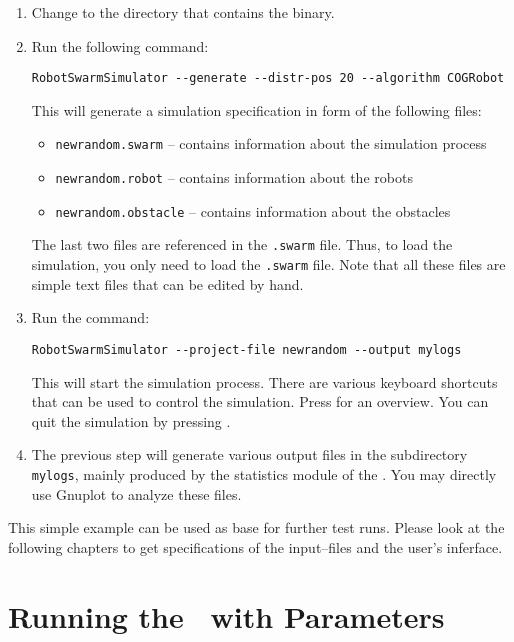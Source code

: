 \documentclass[a4paper,halfparskip,11pt,twoside]{scrartcl}
\begin{document}
\begin{enumerate}
	\item Change to the directory that contains the \RSS binary.
	\item Run the following command:

		\centerline{\tt RobotSwarmSimulator -{}-generate -{}-distr-pos 20 -{}-algorithm COGRobot}

		This will generate a simulation specification in form of the following files:
		\begin{itemize}
			\item {\tt newrandom.swarm} -- contains information about the simulation process
			\item {\tt newrandom.robot} -- contains information about the robots
			\item {\tt newrandom.obstacle} -- contains information about the obstacles
		\end{itemize}
		The last two files are referenced in the {\tt .swarm} file. Thus, to load the simulation, you only need to load the {\tt .swarm} file. Note that all these files
are simple text files that can be edited by hand.
	\item Run the command:

		\centerline{\tt RobotSwarmSimulator -{}-project-file newrandom -{}-output mylogs}

		This will start the simulation process. There are various keyboard shortcuts that can be used to control the simulation. Press  for an overview. You can quit the simulation by pressing .
	\item The previous step will generate various output files in the subdirectory {\tt mylogs}, mainly produced by the statistics module of the \RSS. You may directly use Gnuplot to analyze these files.
\end{enumerate}
This simple example can be used as base for further test runs. Please look at the following chapters to get specifications of the input--files and the user's inferface.

\section{Running the \RSS\ with Parameters}
\end{document}
